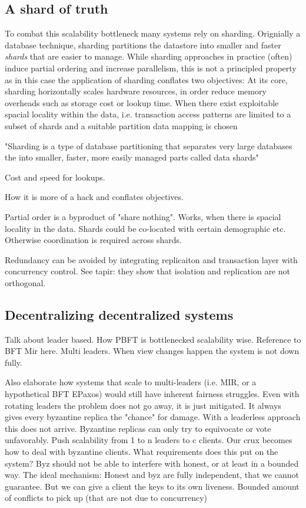 \subsection{A shard of truth}
To combat this scalability bottleneck many systems rely on sharding. Orignially a database technique, sharding partitions the datastore into smaller and faster \textit{shards} that are easier to manage. While sharding approaches in practice (often) induce partial ordering and increase parallelism, this is not a principled property as in this case the application of sharding conflates two objectives:
At its core, sharding horizontally scales hardware resources, in order reduce memory overheads such as storage cost or lookup time. When there exist exploitable spacial locality within the data, i.e. transaction access patterns are limited to a subset of shards
and a suitable partition data mapping is chosen


"Sharding is a type of database partitioning that separates very large databases the into smaller, faster, more easily managed parts called data shards"

Cost and speed for lookups.

How it is more of a hack and conflates objectives.

Partial order is a byproduct of "share nothing". Works, when there is spacial locality in the data. Shards could be co-located with certain demographic etc.  Otherwise coordination is required across shards.


Redundancy can be avoided by integrating replicaiton and transaction layer with concurrency control. See tapir: they show that isolation and replication are not orthogonal.

\subsection{Decentralizing decentralized systems}
Talk about leader based. How PBFT is bottlenecked scalability wise. Reference to BFT Mir here. Multi leaders. When view changes happen the system is not down fully.

Also elaborate how systems that scale to multi-leaders (i.e. MIR, or a hypothetical BFT EPaxos) would still have inherent fairness struggles. Even with rotating leaders the problem does not go away, it is just mitigated. It always gives every byzantine replica the "chance" for damage. With a leaderless approach this does not arrive. Byzantine replicas can only try to equivocate or vote unfavorably.
Push scalability from 1 to n leaders to c clients.
Our crux becomes how to deal with byzantine clients.
What requirements does this put on the system? Byz should not be able to interfere with honest, or at least in a bounded way.
The ideal mechanism: Honest and byz are fully independent, that we cannot guarantee. But we can give a client the keys to its own liveness. Bounded amount of conflicts to pick up (that are not due to concurrency)

